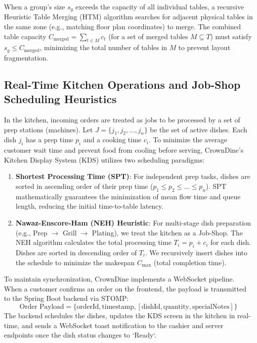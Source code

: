 \documentclass[pdflatex,sn-mathphys-num]{sn-jnl}%
\theoremstyle{thmstyleone}%
\theoremstyle{thmstyletwo}%
\theoremstyle{thmstylethree}%
\begin{document}
When a group's size $s_g$ exceeds the capacity of all individual tables, a recursive Heuristic Table Merging (HTM) algorithm searches for adjacent physical tables in the same zone (e.g., matching floor plan coordinates) to merge. The combined table capacity $C_{\text{merged}} = \sum_{t \in M} c_t$ (for a set of merged tables $M \subseteq T$) must satisfy $s_g \le C_{\text{merged}}$, minimizing the total number of tables in $M$ to prevent layout fragmentation.

\subsection{Real-Time Kitchen Operations and Job-Shop Scheduling Heuristics}
In the kitchen, incoming orders are treated as jobs to be processed by a set of prep stations (machines). Let $J = \{j_1, j_2, \dots, j_n\}$ be the set of active dishes. Each dish $j_i$ has a prep time $p_i$ and a cooking time $c_i$. To minimize the average customer wait time and prevent food from cooling before serving, CrownDine's Kitchen Display System (KDS) utilizes two scheduling paradigms:

\begin{enumerate}
    \item \textbf{Shortest Processing Time (SPT)}: For independent prep tasks, dishes are sorted in ascending order of their prep time ($p_1 \le p_2 \le \dots \le p_n$). SPT mathematically guarantees the minimization of mean flow time and queue length, reducing the initial time-to-table latency.
    \item \textbf{Nawaz-Enscore-Ham (NEH) Heuristic}: For multi-stage dish preparation (e.g., Prep $\rightarrow$ Grill $\rightarrow$ Plating), we treat the kitchen as a Job-Shop. The NEH algorithm calculates the total processing time $T_i = p_i + c_i$ for each dish. Dishes are sorted in descending order of $T_i$. We recursively insert dishes into the schedule to minimize the makespan $C_{\text{max}}$ (total completion time).
\end{enumerate}

To maintain synchronization, CrownDine implements a WebSocket pipeline. When a customer confirms an order on the frontend, the payload is transmitted to the Spring Boot backend via STOMP:
\begin{equation}
\text{Order Payload} = \{ \text{orderId}, \text{timestamp}, [\text{dishId}, \text{quantity}, \text{specialNotes}] \}
\end{equation}
The backend schedules the dishes, updates the KDS screen in the kitchen in real-time, and sends a WebSocket toast notification to the cashier and server endpoints once the dish status changes to `Ready`.
\end{document}
